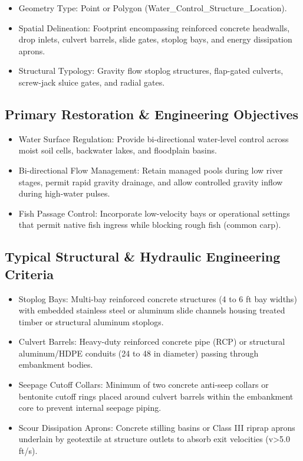 \documentclass[
  letterpaper,
  DIV=11,
  numbers=noendperiod]{scrreprt}
\begin{document}
\begin{itemize}
\item
  Geometry Type: Point or Polygon (Water\_Control\_Structure\_Location).
\item
  Spatial Delineation: Footprint encompassing reinforced concrete
  headwalls, drop inlets, culvert barrels, slide gates, stoplog bays,
  and energy dissipation aprons.
\item
  Structural Typology: Gravity flow stoplog structures, flap-gated
  culverts, screw-jack sluice gates, and radial gates.
\end{itemize}

\subsection{Primary Restoration \& Engineering
Objectives}\label{primary-restoration-engineering-objectives-13}

\begin{itemize}
\item
  Water Surface Regulation: Provide bi-directional water-level control
  across moist soil cells, backwater lakes, and floodplain basins.
\item
  Bi-directional Flow Management: Retain managed pools during low river
  stages, permit rapid gravity drainage, and allow controlled gravity
  inflow during high-water pulses.
\item
  Fish Passage Control: Incorporate low-velocity bays or operational
  settings that permit native fish ingress while blocking rough fish
  (common carp).
\end{itemize}

\subsection{Typical Structural \& Hydraulic Engineering
Criteria}\label{typical-structural-hydraulic-engineering-criteria}

\begin{itemize}
\item
  Stoplog Bays: Multi-bay reinforced concrete structures (4 to 6 ft bay
  widths) with embedded stainless steel or aluminum slide channels
  housing treated timber or structural aluminum stoplogs.
\item
  Culvert Barrels: Heavy-duty reinforced concrete pipe (RCP) or
  structural aluminum/HDPE conduits (24 to 48 in diameter) passing
  through embankment bodies.
\item
  Seepage Cutoff Collars: Minimum of two concrete anti-seep collars or
  bentonite cutoff rings placed around culvert barrels within the
  embankment core to prevent internal seepage piping.
\item
  Scour Dissipation Aprons: Concrete stilling basins or Class III riprap
  aprons underlain by geotextile at structure outlets to absorb exit
  velocities (v\textgreater5.0 ft/s).
\end{itemize}
\end{document}
